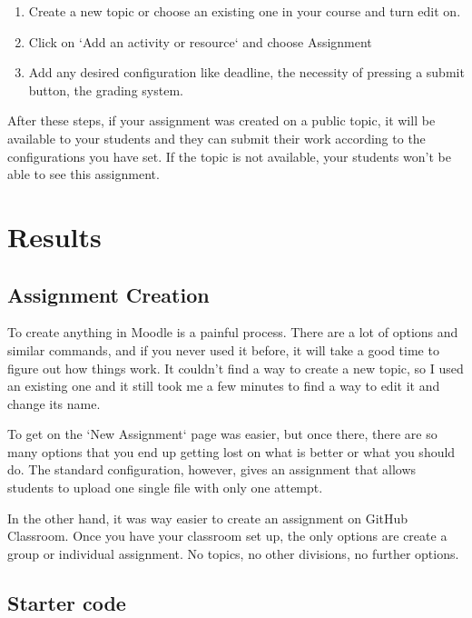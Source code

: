 \documentclass[12pt]{article}
\begin{document}
\begin{enumerate}

\item Create a new topic or choose an existing one in your course and turn edit on.

\item Click on `Add an activity or resource` and choose Assignment

\item Add any desired configuration like deadline, the necessity of pressing a submit button, the grading system. 

\end{enumerate}

After these steps, if your assignment was created on a public topic, it will be available to your students and they can submit their work according to the configurations you have set. If the topic is not available, your students won't be able to see this assignment.


\section{Results}

\subsection{Assignment Creation}

To create anything in Moodle is a painful process. There are a lot of options and similar commands, and if you never used it before, it will take a good time to figure out how things work. It couldn't find a way to create a new topic, so I used an existing one and it still took me a few minutes to find a way to edit it and change its name.

To get on the `New Assignment` page was easier, but once there, there are so many options that you end up getting lost on what is better or what you should do. The standard configuration, however, gives an assignment that allows students to upload one single file with only one attempt.

In the other hand, it was way easier to create an assignment on GitHub Classroom. Once you have your classroom set up, the only options are create a group or individual assignment. No topics, no other divisions, no further options.

\subsection{Starter code}
\end{document}

